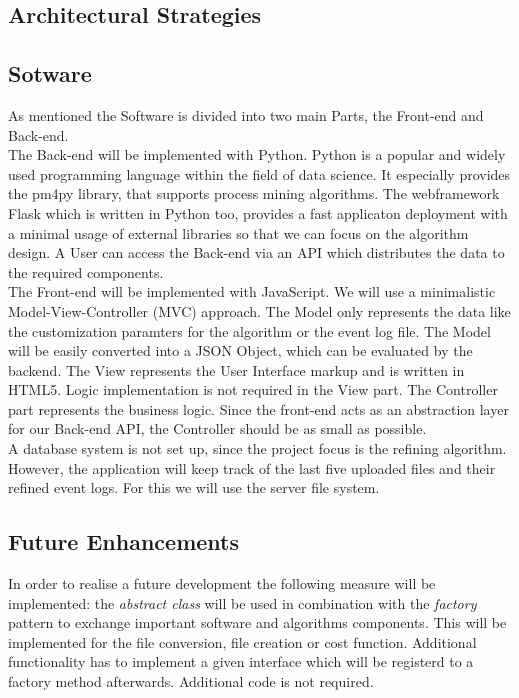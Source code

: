 \documentclass[notitlepage]{article}
\begin{document}
\begin{flushleft}
\section{Architectural Strategies}

\subsection{Sotware}
As mentioned the Software is divided into two main Parts, the Front-end and Back-end.\\ 
\medskip
The Back-end will be implemented with Python.
Python is a popular and widely used programming language within the field of data science. It especially provides the pm4py library, that supports process mining algorithms.
The webframework Flask which is written in Python too, provides a fast applicaton deployment with a minimal usage of external libraries so that we can focus on the algorithm design. A User can access the Back-end via an API which distributes the data to the required components.\\
\medskip
The Front-end will be implemented with JavaScript. We will use a minimalistic Model-View-Controller (MVC) approach. The Model only represents the data like the customization paramters for the algorithm or the event log file. The Model will be easily converted into a JSON Object, which can be evaluated by the backend.
The View represents the User Interface markup and is written in HTML5. Logic implementation is not required in the View part. The Controller part represents 
the business logic. Since the front-end acts as an abstraction layer for our Back-end API, the Controller should be as small as possible.\\
\medskip
A database system is not set up, since the project focus is the refining algorithm. However, the application will keep track of the last five uploaded files and their refined event logs. For this we will use the server file system. 

\subsection{Future Enhancements}
In order to realise a future development the following measure will be implemented: the \textit{abstract class} will be used in combination with the \textit{factory} pattern to exchange important software and algorithms components. 
This will be implemented for the file conversion, file creation or cost function. Additional functionality has to implement a given interface which will be registerd to a factory method afterwards. Additional code is not required. 


\end{flushleft}
\end{document}
